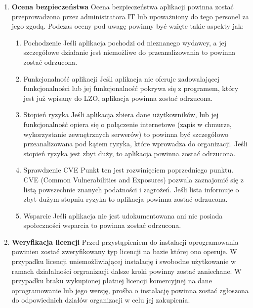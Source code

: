 \documentclass[12pt,a4paper]{article}
\begin{document}
\begin{enumerate}
  Wniosek powinien zostać wysłany na wewnętrzny adres mailowy wsparcia technicznego organizacji. Odpowiedź administratora, wraz z uzasadnieniem (szczególnie w przypadku odmowy) powinna zostać odesłana na adres mailowy nadawcy. Dodatkowo powinna ona zostać zarchiwizowana na wypadek ponownej prośby w przyszłości.
\item
  \textbf{Ocena bezpieczeństwa}
  \newline
  Ocena bezpieczeństwa aplikacji powinna zostać przeprowadzona przez administratora IT lub upoważniony do tego personel za jego zgodą. Podczas oceny pod uwagę powinny być wzięte takie aspekty jak:
  \begin{enumerate}
      \item Pochodzenie Jeśli aplikacja pochodzi od nieznanego wydawcy, a jej szczegółowe działanie jest niemożliwe do przeanalizowania to powinna zostać odrzucona.
      \item Funkcjonalność aplikacji Jeśli aplikacja nie oferuje zadowalającej funkcjonalności lub jej funkcjonalność pokrywa się z programem, który jest już wpisany do LZO, aplikacja powinna zostać odrzucona.
      \item Stopień ryzyka Jeśli aplikacja zbiera dane użytkowników, lub jej funkcjonalność opiera się o połączenie internetowe (zapis w chmurze, wykorzystanie zewnętrznych serwerów) to powinna być szczegółowo przeanalizowana pod kątem ryzyka, które wprowadza do organizacji. Jeśli stopień ryzyka jest zbyt duży, to aplikacja powinna zostać odrzucona.
      \item Sprawdzenie CVE Punkt ten jest rozwinięciem poprzedniego punktu. CVE (Common Vulnerabilities and Exposures) pozwala zaznajomić się z listą powszechnie znanych podatności i zagrożeń. Jeśli lista informuje o zbyt dużym stopniu ryzyka to aplikacja powinna zostać odrzucona.
      \item Wsparcie Jeśli aplikacja nie jest udokumentowana ani nie posiada społeczności wsparcia to powinna zostać odrzucona.
  \end{enumerate}
\item
  \textbf{Weryfikacja licencji}
  \newline
  Przed przystąpieniem do instalacji oprogramowania powinien zostać zweryfikowany typ licencji na bazie której ono operuje. W przypadku licencji uniemożliwiającej instalację i swobodne użytkowanie w ramach działalności orgranizacji dalsze kroki powinny zostać zaniechane. W przypadku braku wykupionej płatnej licencji komercyjnej na dane oprogramowanie lub jego wersję, prośba o instalację powinna zostać zgłoszona do odpowiednich działów organizacji w celu jej zakupienia.

\end{enumerate}
\end{document}
